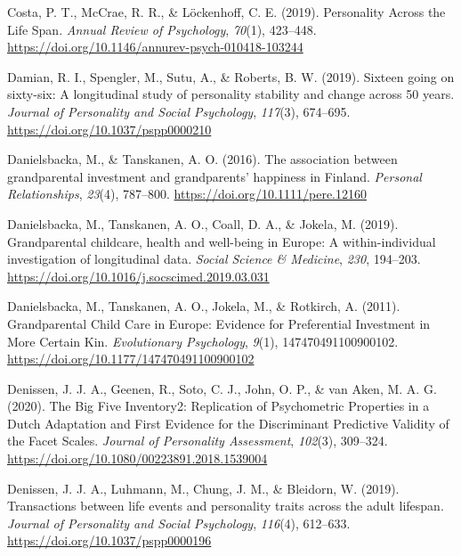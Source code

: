 \documentclass[
  english,
  man,floatsintext]{apa7}
\begin{document}
\leavevmode\hypertarget{ref-costaPersonalityLifeSpan2019}{}%
Costa, P. T., McCrae, R. R., \& Löckenhoff, C. E. (2019). Personality Across the Life Span. \emph{Annual Review of Psychology}, \emph{70}(1), 423--448. \url{https://doi.org/10.1146/annurev-psych-010418-103244}

\leavevmode\hypertarget{ref-damianSixteenGoingSixtysix2019}{}%
Damian, R. I., Spengler, M., Sutu, A., \& Roberts, B. W. (2019). Sixteen going on sixty-six: A longitudinal study of personality stability and change across 50 years. \emph{Journal of Personality and Social Psychology}, \emph{117}(3), 674--695. \url{https://doi.org/10.1037/pspp0000210}

\leavevmode\hypertarget{ref-danielsbackaAssociationGrandparentalInvestment2016}{}%
Danielsbacka, M., \& Tanskanen, A. O. (2016). The association between grandparental investment and grandparents' happiness in Finland. \emph{Personal Relationships}, \emph{23}(4), 787--800. \url{https://doi.org/10.1111/pere.12160}

\leavevmode\hypertarget{ref-danielsbackaGrandparentalChildcareHealth2019}{}%
Danielsbacka, M., Tanskanen, A. O., Coall, D. A., \& Jokela, M. (2019). Grandparental childcare, health and well-being in Europe: A within-individual investigation of longitudinal data. \emph{Social Science \& Medicine}, \emph{230}, 194--203. \url{https://doi.org/10.1016/j.socscimed.2019.03.031}

\leavevmode\hypertarget{ref-danielsbackaGrandparentalChildCare2011}{}%
Danielsbacka, M., Tanskanen, A. O., Jokela, M., \& Rotkirch, A. (2011). Grandparental Child Care in Europe: Evidence for Preferential Investment in More Certain Kin. \emph{Evolutionary Psychology}, \emph{9}(1), 147470491100900102. \url{https://doi.org/10.1177/147470491100900102}

\leavevmode\hypertarget{ref-denissenBigFiveInventory2020}{}%
Denissen, J. J. A., Geenen, R., Soto, C. J., John, O. P., \& van Aken, M. A. G. (2020). The Big Five Inventory2: Replication of Psychometric Properties in a Dutch Adaptation and First Evidence for the Discriminant Predictive Validity of the Facet Scales. \emph{Journal of Personality Assessment}, \emph{102}(3), 309--324. \url{https://doi.org/10.1080/00223891.2018.1539004}

\leavevmode\hypertarget{ref-denissenTransactionsLifeEvents2019}{}%
Denissen, J. J. A., Luhmann, M., Chung, J. M., \& Bleidorn, W. (2019). Transactions between life events and personality traits across the adult lifespan. \emph{Journal of Personality and Social Psychology}, \emph{116}(4), 612--633. \url{https://doi.org/10.1037/pspp0000196}
\end{document}
